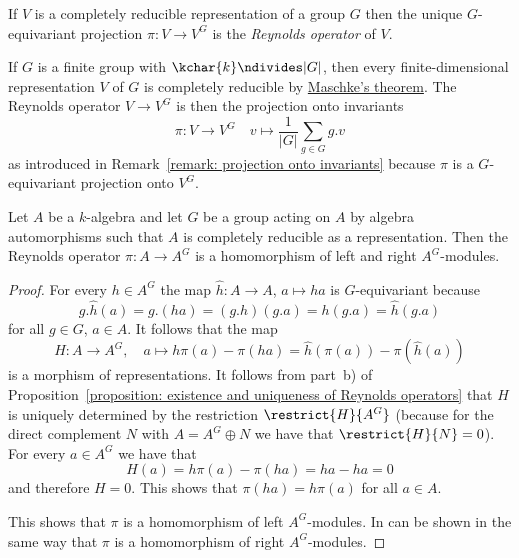 \begin{definition}
  If $V$ is a completely reducible representation of a group $G$ then the unique $G$-equivariant projection $\pi \colon V \to V^G$ is the \emph{Reynolds operator} of $V$.
\end{definition}


\begin{example}
  If $G$ is a finite group with $\kchar{k} \ndivides |G|$, then every finite-dimensional representation $V$ of $G$ is completely reducible by \hyperref[theorem: Maschkes theorem]{Maschke’s theorem}.
  The Reynolds operator $V \to V^G$ is then the projection onto invariants
  \[
            \pi
    \colon  V
    \to     V^G
    \quad   v
    \mapsto \frac{1}{|G|} \sum_{g \in G} g.v
  \]
  as introduced in Remark~\ref{remark: projection onto invariants} because $\pi$ is a $G$-equivariant projection onto $V^G$.
\end{example}


\begin{lemma}
  \label{lemma: reynolds operator is homomorphism}
  Let $A$ be a $k$-algebra and let $G$ be a group acting on $A$ by algebra automorphisms such that $A$ is completely reducible as a representation.
  Then the Reynolds operator $\pi \colon A \to A^G$ is a homomorphism of left and right $A^G$-modules.
\end{lemma}


\begin{proof}
  For every $h \in A^G$ the map $\hat{h} \colon A \to A$, $a \mapsto ha$ is $G$-equivariant because
  \[
      g.\hat{h}(a)
    = g.(ha)
    = (g.h)(g.a)
    = h(g.a)
    = \hat{h}(g.a)
  \]
  for all $g \in G$, $a \in A$.
  It follows that the map
  \[
            H
    \colon  A
    \to     A^G,
    \quad   a
    \mapsto h\pi(a) - \pi(ha)
    =       \hat{h}(\pi(a)) - \pi(\hat{h}(a))
  \]
  is a morphism of representations.
  It follows from part~b) of Proposition~\ref{proposition: existence and uniqueness of Reynolds operators} that $H$ is uniquely determined by the restriction $\restrict{H}{A^G}$ (because for the direct complement $N$ with $A = A^G \oplus N$ we have that $\restrict{H}{N} = 0$).
  For every $a \in A^G$ we have that
  \[
      H(a)
    = h\pi(a) - \pi(ha)
    = ha - ha
    = 0
  \]
  and therefore $H = 0$.
  This shows that $\pi(ha) = h\pi(a)$ for all $a \in A$.
  
  This shows that $\pi$ is a homomorphism of left $A^G$-modules.
  In can be shown in the same way that $\pi$ is a homomorphism of right $A^G$-modules.
\end{proof}



